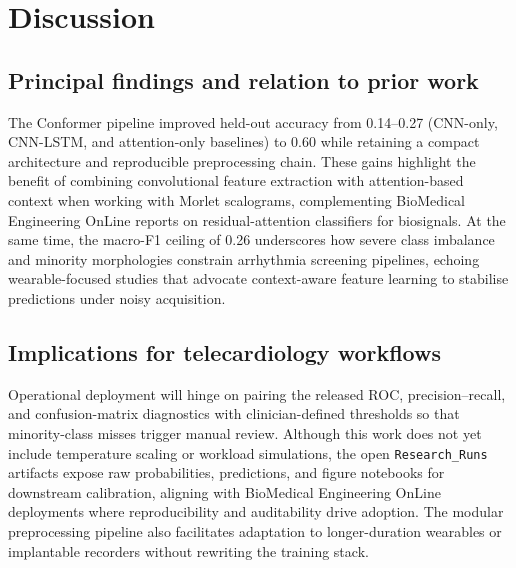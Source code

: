 \section{Discussion}
\subsection{Principal findings and relation to prior work}
The Conformer pipeline improved held-out accuracy from 0.14--0.27 (CNN-only, CNN-LSTM, and attention-only baselines) to 0.60 while retaining a compact architecture and reproducible preprocessing chain. These gains highlight the benefit of combining convolutional feature extraction with attention-based context when working with Morlet scalograms, complementing BioMedical Engineering OnLine reports on residual-attention classifiers for biosignals.\cite{Czerwinski2025Interpretable,Gliner2025Interpretability} At the same time, the macro-F1 ceiling of 0.26 underscores how severe class imbalance and minority morphologies constrain arrhythmia screening pipelines, echoing wearable-focused studies that advocate context-aware feature learning to stabilise predictions under noisy acquisition.\cite{Gadaleta2023SingleLead}

\subsection{Implications for telecardiology workflows}
Operational deployment will hinge on pairing the released ROC, precision--recall, and confusion-matrix diagnostics with clinician-defined thresholds so that minority-class misses trigger manual review. Although this work does not yet include temperature scaling or workload simulations, the open \texttt{Research\_Runs} artifacts expose raw probabilities, predictions, and figure notebooks for downstream calibration, aligning with BioMedical Engineering OnLine deployments where reproducibility and auditability drive adoption.\cite{Yoon2023Interpretable,Stern2024InBed,Silva2023Infusion} The modular preprocessing pipeline also facilitates adaptation to longer-duration wearables or implantable recorders without rewriting the training stack.

